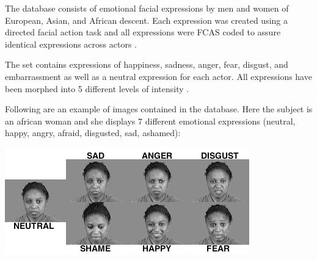 \vspace{\baselineskip}
\noindent The database consists of emotional facial expressions by men and women of European, Asian, and African descent. Each expression was created using a directed facial action task and all expressions were FCAS coded to assure identical expressions across actors \cite{MSFDE}.
\newline

\noindent The set contains expressions of happiness, sadness, anger, fear, disgust, and embarrassment as well as a neutral expression for each actor. All expressions have been morphed into 5 different levels of intensity \cite{MSFDE}.
\newline

\noindent Following are an example of images contained in the database. Here the subject is an african woman and she displays 7 different emotional expressions (neutral, happy, angry, afraid, disgusted, sad, ashamed): 
\newline

\vspace{\baselineskip}
\begin{center}
\noindent \includegraphics[scale=0.9]{figures/msfde_7facialexpressions} 
\newline
\end{center} 






